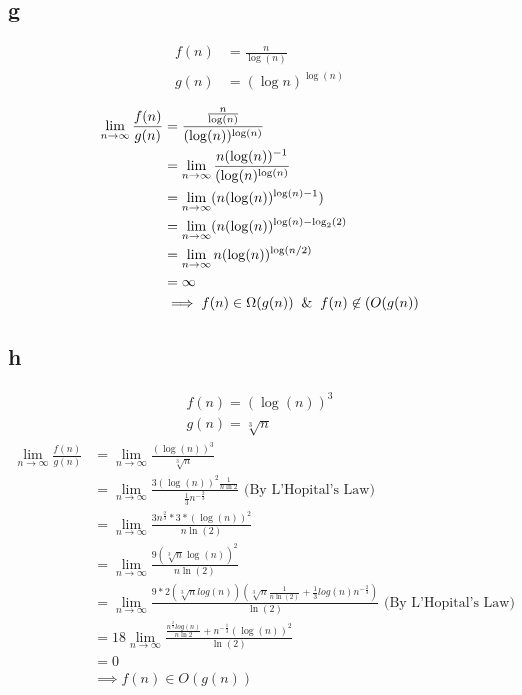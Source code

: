 \subsection*{g}
\begin{align*}
    f(n) &= \frac{n}{\log(n)}\\
    g(n) &= (\log n)^{\log(n)}
\end{align*}

\begin{align*}
    \lim_{n \to \infty} \frac{f(n)}{g(n)} &= \frac{\frac{n}{\log(n)}}{(\log(n))^{\log(n)}}\\
    &= \lim_{n \to \infty} \frac{n (\log(n))^{-1}}{(\log(n)^{\log(n)}}\\
    &= \lim_{n \to \infty} (n (\log(n))^{\log(n)-1})\\
    &= \lim_{n \to \infty} (n (\log(n))^{\log(n) - \log_2(2)}\\
    &= \lim_{n \to \infty} n (\log(n))^{\log(n/2)}\\
    &= \infty\\
    &\implies f(n) \in \Omega(g(n)) \And f(n) \not\in(O(g(n))
\end{align*}

\subsection*{h}
\begin{align*}
    f(n) = (\log(n))^3\\
    g(n) = \sqrt[3]{n}
\end{align*}
\begin{align*}
    \lim_{n \to \infty}\frac{f(n)}{g(n)} &= \lim_{n \to \infty}\frac{(\log(n))^3}{\sqrt[3]{n}}\\
    &= \lim_{n \to \infty} \frac{3(\log(n))^2 \frac{1}{n \ln 2}}{\frac{1}{3} n ^ {-\frac{2}{3}}} \text{ (By L'Hopital's Law)}\\
    &= \lim_{n \to \infty}\frac{3n^{\frac{2}{3}}*3*(\log(n))^2 }{n \ln(2)}\\
    &= \lim_{n \to \infty}\frac{9 (\sqrt[3]{n}\log(n))^2}{n \ln(2)}\\
    &= \lim_{n \to \infty}\frac{9 * 2 (\sqrt[3]{n}log(n))(\sqrt[3]{n}\frac{1}{n \ln(2)} + \frac{1}{3}log(n)n^{-\frac{2}{3}})}{\ln(2)} \text{ (By L'Hopital's Law)}\\
    &= 18 \lim_{n \to \infty} \frac{\frac{n^{\frac{2}{3}}log(n)}{n \ln 2} + n^{-\frac{1}{3}} (\log(n))^2}{\ln(2)}\\
    &= 0\\
    &\implies f(n) \in O(g(n))
\end{align*}
